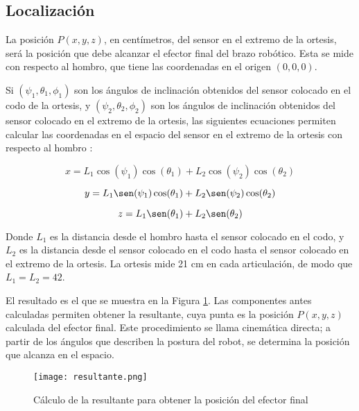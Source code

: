 \subsection{Localización}

La posición $P(x, y, z)$, en centímetros, del sensor en el extremo de la ortesis, será la posición que debe alcanzar el efector final del brazo robótico. Esta se mide con respecto al hombro, que tiene las coordenadas en el origen $(0, 0 ,0)$.

Si $(\psi_{1}, \theta_{1}, \phi_{1})$ son los ángulos de inclinación obtenidos del sensor colocado en el codo de la ortesis, y $(\psi_{2}, \theta_{2}, \phi_{2})$ son los ángulos de inclinación obtenidos del sensor colocado en el extremo de la ortesis, las siguientes ecuaciones permiten calcular las coordenadas en el espacio del sensor en el extremo de la ortesis con respecto al hombro \cite{tailtbryan}:

\begin{equation}
x = L_1 \cos(\psi_1) \cos(\theta_1) + L_2 \cos(\psi_2) \cos(\theta_2)
\end{equation}

\begin{equation}
y = L_1 \sen(\psi_1) \cos(\theta_1) + L_2 \sen(\psi_2) \cos(\theta_2)
\end{equation}

\begin{equation}
z = L_1 \sen(\theta_1) + L_2 \sen(\theta_2)
\end{equation}

Donde $L_1$ es la distancia desde el hombro hasta el sensor colocado en el codo, y $L_2$ es la distancia desde el sensor colocado en el codo hasta el sensor colocado en el extremo de la ortesis. La ortesis mide 21 cm en cada articulación, de modo que $L_1 = L_2 = 42$.

El resultado es el que se muestra en la Figura \ref{fig:resultante}. Las componentes antes calculadas permiten obtener la resultante, cuya punta es la posición $P(x,y,z)$ calculada del efector final. Este procedimiento se llama cinemática directa; a partir de los ángulos que describen la postura del robot, se determina la posición que alcanza en el espacio.

\begin{figure}[htb]
	\centering
	\texttt{[image: resultante.png]}
	\caption{Cálculo de la resultante para obtener la posición del efector final}
	\label{fig:resultante}
\end{figure}